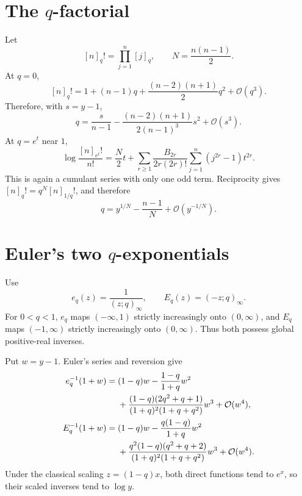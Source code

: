 \documentclass[11pt,oneside]{book}
\theoremstyle{definition}
\theoremstyle{remark}
\newcommand{\OO}{\mathcal{O}}
\begin{document}
\section{The $q$-factorial}
Let
\[
 [n]_q!=\prod_{j=1}^n[j]_q,
 \qquad N=\frac{n(n-1)}2.
\]
At $q=0$,
\[
 [n]_q!=1+(n-1)q+\frac{(n-2)(n+1)}2q^2+\OO(q^3).
\]
Therefore, with $s=y-1$,
\begin{equation}\label{eq:qfactorial-qzero-inverse}
 q=\frac{s}{n-1}
 -\frac{(n-2)(n+1)}{2(n-1)^3}s^2+\OO(s^3).
\end{equation}
At $q=e^t$ near $1$,
\begin{equation}\label{eq:qfactorial-qone-direct}
 \log\frac{[n]_{e^t}!}{n!}
 =\frac N2t+
 \sum_{r\ge1}\frac{B_{2r}}{2r(2r)!}
 \sum_{j=1}^n(j^{2r}-1)t^{2r}.
\end{equation}
This is again a cumulant series with only one odd term.  Reciprocity gives
$[n]_q!=q^N[n]_{1/q}!$, and therefore
\begin{equation}\label{eq:qfactorial-infty-inverse}
 q=y^{1/N}-\frac{n-1}{N}+\OO(y^{-1/N}).
\end{equation}

\section{Euler's two $q$-exponentials}
Use
\[
 e_q(z)=\frac1{(z;q)_\infty},
 \qquad E_q(z)=(-z;q)_\infty.
\]
For $0<q<1$, $e_q$ maps $(-\infty,1)$ strictly increasingly onto
$(0,\infty)$, and $E_q$ maps $(-1,\infty)$ strictly increasingly onto
$(0,\infty)$.  Thus both possess global positive-real inverses.

Put $w=y-1$.  Euler's series and reversion give
\begin{align}
 e_q^{-1}(1+w)={}&(1-q)w-\frac{1-q}{1+q}w^2\notag\\
 &+\frac{(1-q)(2q^2+q+1)}{(1+q)^2(1+q+q^2)}w^3
 +\OO(w^4),\label{eq:eq-inverse}\\
 E_q^{-1}(1+w)={}&(1-q)w-\frac{q(1-q)}{1+q}w^2\notag\\
 &+\frac{q^2(1-q)(q^2+q+2)}{(1+q)^2(1+q+q^2)}w^3
 +\OO(w^4).\label{eq:Eq-inverse}
\end{align}
Under the classical scaling $z=(1-q)x$, both direct functions tend to $e^x$,
so their scaled inverses tend to $\log y$.
\end{document}

